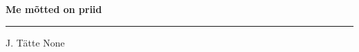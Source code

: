 \documentclass[10pt]{book}
\begin{document}
{
  \samepage
  \raggedbottom
  \raggedright
  \sloppy


  \vspace{0.2in}

  \noindent\begin{minipage}{.1\textwidth}
    \hfill\vspace{0.1in}
  \end{minipage}%
  \noindent\begin{minipage}{.8\textwidth}
    \centering
    \bfseries
    \large Me m\~otted on priid
  \end{minipage}%
  \noindent\begin{minipage}{.1\textwidth}
      \hfill\vspace{0.1in}
  \end{minipage}

  \nopagebreak[4]
  \vspace{0.1in}
  \nopagebreak[4]
  \hrule height 0.05ex
  \nopagebreak[4]
  \vspace{-0.05in}

  {\footnotesize J. T\"atte \hfill None }\\
  \vspace{0.01in}



}
\end{document}
